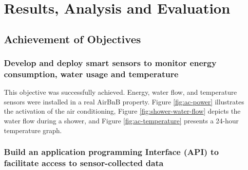 

\chapter{Results, Analysis and Evaluation}


    

\section{Achievement of Objectives}

\subsection{Develop and deploy smart sensors to monitor energy consumption, water usage and temperature}

This objective was successfully achieved. Energy, water flow, and temperature sensors were installed in a real AirBnB 
property. Figure \ref{fig:ac-power} illustrates the activation of the air conditioning, Figure 
\ref{fig:shower-water-flow} depicts the water flow during a shower, and Figure \ref{fig:ac-temperature} presents a 
24-hour temperature graph.

\subsection{Build an application programming Interface (API) to facilitate access to sensor-collected data}

